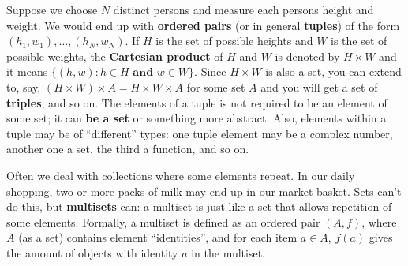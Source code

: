 Suppose we choose $N$ distinct persons and measure each persons height and weight. We would end up with \textbf{ordered pairs} (or in general \textbf{tuples}) of the form $(h_1, w_1), \dots, (h_N, w_N)$. If $H$ is the set of possible heights and $W$ is the set of possible weights, the \textbf{Cartesian product} of $H$ and $W$ is denoted by $H \times W$ and it means $\{ (h, w) \colon h \in H \textbf{ and } w \in W\}$. Since $H \times W$ is also a set, you can extend to, say, $(H \times W) \times A = H \times W \times A$ for some set $A$ and you will get a set of \textbf{triples}, and so on. The elements of a tuple is not required to be an element of some set; it can \textbf{be a set} or something more abstract. Also, elements within a tuple may be of ``different'' types: one tuple element may be a complex number, another one a set, the third a function, and so on.

Often we deal with collections where some elements repeat. In our daily shopping, two or more packs of milk may end up in our market basket. Sets can't do this, but \textbf{multisets} can: a multiset is just like a set that allows repetition of some elements. Formally, a multiset is defined as an ordered pair $(A, f)$, where $A$ (as a set) contains element ``identities'', and for each item $a \in A$, $f(a)$ gives the amount of objects with identity $a$ in the multiset.